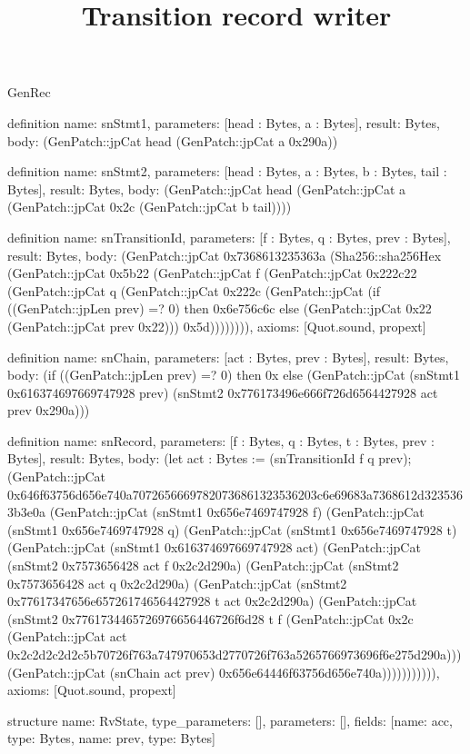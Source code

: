 \begin{lexlean}{GenRec}
\title{Transition record writer}
\begin{semanticmodule}
definition{
  name: snStmt1,
  parameters: [head : Bytes, a : Bytes],
  result: Bytes,
  body: (GenPatch::jpCat head (GenPatch::jpCat a 0x290a))
}

definition{
  name: snStmt2,
  parameters: [head : Bytes, a : Bytes, b : Bytes, tail : Bytes],
  result: Bytes,
  body: (GenPatch::jpCat head (GenPatch::jpCat a (GenPatch::jpCat 0x2c (GenPatch::jpCat b tail))))
}

definition{
  name: snTransitionId,
  parameters: [f : Bytes, q : Bytes, prev : Bytes],
  result: Bytes,
  body: (GenPatch::jpCat 0x7368613235363a (Sha256::sha256Hex (GenPatch::jpCat 0x5b22 (GenPatch::jpCat f (GenPatch::jpCat 0x222c22 (GenPatch::jpCat q (GenPatch::jpCat 0x222c (GenPatch::jpCat (if ((GenPatch::jpLen prev) =? 0) then 0x6e756c6c else (GenPatch::jpCat 0x22 (GenPatch::jpCat prev 0x22))) 0x5d)))))))),
  axioms: [Quot.sound, propext]
}

definition{
  name: snChain,
  parameters: [act : Bytes, prev : Bytes],
  result: Bytes,
  body: (if ((GenPatch::jpLen prev) =? 0) then 0x else (GenPatch::jpCat (snStmt1 0x616374697669747928 prev) (snStmt2 0x776173496e666f726d6564427928 act prev 0x290a)))
}

definition{
  name: snRecord,
  parameters: [f : Bytes, q : Bytes, t : Bytes, prev : Bytes],
  result: Bytes,
  body: (let act : Bytes := (snTransitionId f q prev); (GenPatch::jpCat 0x646f63756d656e740a70726566697820736861323536203c6e69683a7368612d3235363b3e0a (GenPatch::jpCat (snStmt1 0x656e7469747928 f) (GenPatch::jpCat (snStmt1 0x656e7469747928 q) (GenPatch::jpCat (snStmt1 0x656e7469747928 t) (GenPatch::jpCat (snStmt1 0x616374697669747928 act) (GenPatch::jpCat (snStmt2 0x7573656428 act f 0x2c2d290a) (GenPatch::jpCat (snStmt2 0x7573656428 act q 0x2c2d290a) (GenPatch::jpCat (snStmt2 0x77617347656e657261746564427928 t act 0x2c2d290a) (GenPatch::jpCat (snStmt2 0x7761734465726976656446726f6d28 t f (GenPatch::jpCat 0x2c (GenPatch::jpCat act 0x2c2d2c2d2c5b70726f763a747970653d2770726f763a5265766973696f6e275d290a))) (GenPatch::jpCat (snChain act prev) 0x656e64446f63756d656e740a))))))))))),
  axioms: [Quot.sound, propext]
}

structure{
  name: RvState,
  type_parameters: [],
  parameters: [],
  fields: [{name: acc, type: Bytes}, {name: prev, type: Bytes}]
}


\end{semanticmodule}
\end{lexlean}
